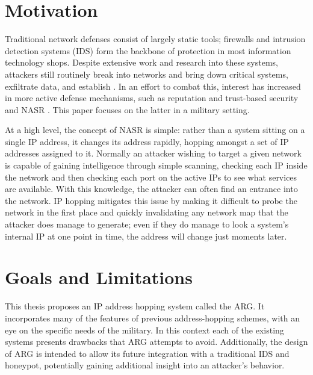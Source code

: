 \section{Motivation}
\par Traditional network defenses consist of largely static tools; firewalls and intrusion detection systems (IDS) form the backbone of protection in most information technology shops. Despite extensive work and research into these systems, attackers still routinely break into networks and bring down critical systems, exfiltrate data, and establish . In an effort to combat this, interest has increased in more active defense mechanisms, such as reputation and trust-based security \cite{Untrustworthiness} and \ac{NASR} \cite{APOD, NAH}. This paper focuses on the latter in a military setting.

\par At a high level, the concept of NASR is simple: rather than a system sitting on a single \ac{IP} address, it changes its address rapidly, hopping amongst a set of \ac{IP} addresses assigned to it. Normally an attacker wishing to target a given network is capable of gaining intelligence through simple scanning, checking each IP inside the network and then checking each port on the active IPs to see what services are available. With this knowledge, the attacker can often find an entrance into the network. IP hopping mitigates this issue by making it difficult to probe the network in the first place and quickly invalidating any network map that the attacker does manage to generate; even if they do manage to look a system's internal IP at one point in time, the address will change just moments later.

\section{Goals and Limitations}
\par This thesis proposes an IP address hopping system called the \ac{ARG}. It incorporates many of the features of previous address-hopping schemes, with an eye on the specific needs of the military. In this context each of the existing systems presents drawbacks that \ac{ARG} attempts to avoid. Additionally, the design of ARG is intended to allow its future integration with a traditional IDS and honeypot, potentially gaining additional insight into an attacker's behavior.

